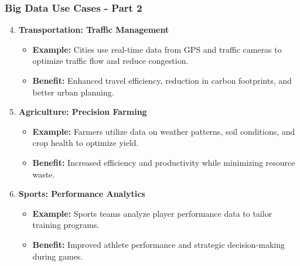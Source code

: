 \documentclass[aspectratio=169]{beamer}
\begin{document}
\begin{frame}[fragile]
    \frametitle{Big Data Use Cases - Part 2}
    \begin{enumerate}
        \setcounter{enumi}{3}
        \item \textbf{Transportation: Traffic Management}  
            \begin{itemize}
                \item \textbf{Example:} Cities use real-time data from GPS and traffic cameras to optimize traffic flow and reduce congestion.
                \item \textbf{Benefit:} Enhanced travel efficiency, reduction in carbon footprints, and better urban planning.
            \end{itemize}
          
        \item \textbf{Agriculture: Precision Farming}  
            \begin{itemize}
                \item \textbf{Example:} Farmers utilize data on weather patterns, soil conditions, and crop health to optimize yield.
                \item \textbf{Benefit:} Increased efficiency and productivity while minimizing resource waste.
            \end{itemize}
          
        \item \textbf{Sports: Performance Analytics}  
            \begin{itemize}
                \item \textbf{Example:} Sports teams analyze player performance data to tailor training programs.
                \item \textbf{Benefit:} Improved athlete performance and strategic decision-making during games.
            \end{itemize}
    \end{enumerate}
\end{frame}
\end{document}
